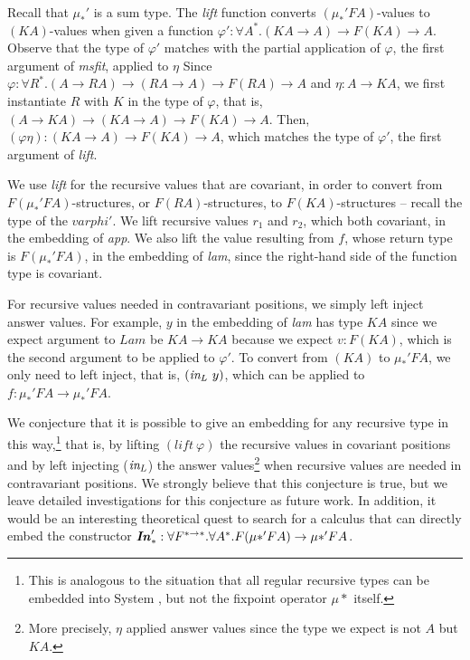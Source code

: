 Recall that $\mu_{*}'$ is a sum type. The \textit{lift} function converts
$(\mu_{*}'FA)$-values to $(KA)$-values when given a function
$\varphi' : \forall A^{*}.(KA \to A) \to F(K A) \to A$.
Observe that the type of $\varphi'$ matches with the partial application of
$\varphi$, the first argument of \textit{msfit}, applied to $\eta$ Since
$\varphi : \forall R^{*}.(A \to R A) \to (R A \to A) \to F(R A) \to A$
and $\eta : A \to K A$, we first instantiate $R$ with $K$ in the type of
$\varphi$, that is, $(A \to K A) \to (K A \to A) \to F(K A) \to A$.
Then, $(\varphi\eta) : (K A \to A) \to F(K A) \to A$, which matches
the type of $\varphi'$, the first argument of \textit{lift}.

We use \textit{lift} for the recursive values that are covariant,
in order to convert from $F(\mu_{*}'FA)$-structures, or $F(RA)$-structures,
to $F(KA)$-structures -- recall the type of the $varphi'$.
We lift recursive values $r_1$ and $r_2$, which both covariant,
in the embedding of \textit{app}. We also lift the value resulting from $f$,
whose return type is $F(\mu_{*}'FA)$, in the embedding of \textit{lam},
since the right-hand side of the function type is covariant.

For recursive values needed in contravariant positions, we simply left inject
answer values. For example, $y$ in the embedding of \textit{lam} has type $KA$
since we expect argument to $Lam$ be $KA \to KA$ because we expect $v : F(KA)$,
which is the second argument to be applied to $\varphi'$. To convert from
$(KA)$ to $\mu_{*}'FA$, we only need to left inject, that is, $(\textit{in}_{L}~y)$,
which can be applied to $f : \mu_{*}'FA \to \mu_{*}'FA$.

We conjecture that it is possible to give an embedding for any recursive type
in this way,\footnote{This is analogous to the situation that
	all regular recursive types can be embedded into System \F,
	but not the fixpoint operator $\mu{*}$ itself.}
that is, by lifting $(\textit{lift}~\varphi)$ the recursive values in
covariant positions and by left injecting ($\textit{in}_{L}$) the answer values\footnote{
	More precisely, $\eta$ applied answer values
	since the type we expect is not $A$ but $K A$.}
when recursive values are needed in contravariant positions.
We strongly believe that this conjecture is true, but we leave
detailed investigations for this conjecture as future work.
In addition, it would be an interesting theoretical quest to search for
a calculus that can directly embed the constructor
$\textbf{\textit{In}}_{*}' : \forall F^{*\to*}.\forall A^{*}.F(\mu{*}' F A) \to \mu{*}' F A$.

